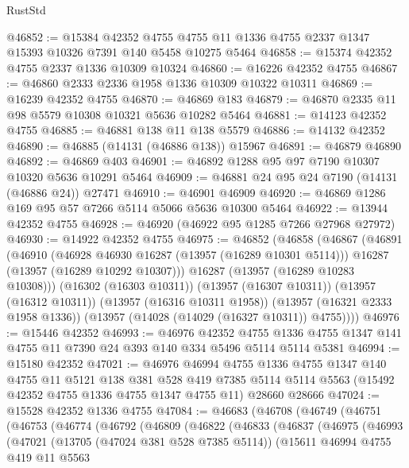 \begin{lexlean}{RustStd}
\begin{coremodule}
@46852 := @15384
    @42352
    @4755
    @4755
    @11
    @1336
    @4755
    @2337
    @1347
    @15393
    @10326
    @7391
    @140
    @5458
    @10275
    @5464
@46858 := @15374 @42352 @4755 @2337 @1336 @10309 @10324
@46860 := @16226 @42352 @4755
@46867 := @46860 @2333 @2336 @1958 @1336 @10309 @10322 @10311
@46869 := @16239 @42352 @4755
@46870 := @46869 @183
@46879 := @46870 @2335 @11 @98 @5579 @10308 @10321 @5636 @10282 @5464
@46881 := @14123 @42352 @4755
@46885 := @46881 @138 @11 @138 @5579
@46886 := @14132 @42352
@46890 := @46885 (@14131 (@46886 @138)) @15967
@46891 := @46879 @46890
@46892 := @46869 @403
@46901 := @46892 @1288 @95 @97 @7190 @10307 @10320 @5636 @10291 @5464
@46909 := @46881 @24 @95 @24 @7190 (@14131 (@46886 @24)) @27471
@46910 := @46901 @46909
@46920 := @46869 @1286 @169 @95 @57 @7266 @5114 @5066 @5636 @10300 @5464
@46922 := @13944 @42352 @4755
@46928 := @46920 (@46922 @95 @1285 @7266 @27968 @27972)
@46930 := @14922 @42352 @4755
@46975 := @46852
    (@46858
      (@46867
        (@46891
          (@46910
            (@46928 @46930 @16287 (@13957 (@16289 @10301 @5114)))
            @16287
            (@13957 (@16289 @10292 @10307)))
          @16287
          (@13957 (@16289 @10283 @10308)))
        (@16302 (@16303 @10311))
        (@13957 (@16307 @10311))
        (@13957 (@16312 @10311))
        (@13957 (@16316 @10311 @1958))
        (@13957 (@16321 @2333 @1958 @1336))
        (@13957 (@14028 (@14029 (@16327 @10311)) @4755))))
@46976 := @15446 @42352
@46993 := @46976
    @42352
    @4755
    @1336
    @4755
    @1347
    @141
    @4755
    @11
    @7390
    @24
    @393
    @140
    @334
    @5496
    @5114
    @5114
    @5381
@46994 := @15180 @42352
@47021 := @46976
    @46994
    @4755
    @1336
    @4755
    @1347
    @140
    @4755
    @11
    @5121
    @138
    @381
    @528
    @419
    @7385
    @5114
    @5114
    @5563
    (@15492 @42352 @4755 @1336 @4755 @1347 @4755 @11)
    @28660
    @28666
@47024 := @15528 @42352 @1336 @4755
@47084 := @46683
    (@46708
      (@46749
        (@46751
          (@46753
            (@46774
              (@46792
                (@46809
                  (@46822
                    (@46833
                      (@46837
                        (@46975
                          (@46993
                            (@47021
                              (@13705 (@47024 @381 @528 @7385 @5114))
                              (@15611
                                @46994
                                @4755
                                @419
                                @11
                                @5563

\end{coremodule}
\end{lexlean}
